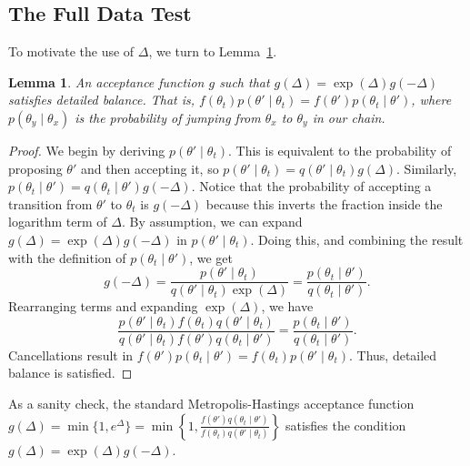 \documentclass{article}
\newtheorem{lemma}{Lemma}
\begin{document}
\subsection{The Full Data Test}\label{ssec:deltas_full}

To motivate the use of $\Delta$, we turn to Lemma~\ref{lem:detailed_balance}.

\begin{lemma}\label{lem:detailed_balance}
An acceptance function $g$ such that $g(\Delta) = \exp(\Delta) g(-\Delta )$ satisfies detailed
balance. That is, $f(\theta_t)p(\theta' \mid \theta_t) = f(\theta')p(\theta_t \mid \theta')$, where
$p(\theta_y \mid \theta_x)$ is the probability of jumping from $\theta_x$ to $\theta_y$ in our
chain.
\end{lemma}

\begin{proof}
We begin by deriving $p(\theta' \mid \theta_t)$. This is equivalent to the probability of proposing
$\theta'$ and then accepting it, so $p(\theta' \mid \theta_t) = q(\theta' \mid \theta_t)g(\Delta).$
Similarly, $p(\theta_t \mid \theta') = q(\theta_t \mid \theta')g(-\Delta).$ Notice that the
probability of accepting a transition from $\theta'$ to $\theta_t$ is $g(-\Delta)$ because this
inverts the fraction inside the logarithm term of $\Delta$.  By assumption, we can expand $g(\Delta)
= \exp(\Delta)g(-\Delta)$ in $p(\theta' \mid \theta_t)$. Doing this, and combining the result with
the definition of $p(\theta_t \mid \theta')$, we get
\begin{equation}\label{eq:combined}
g(-\Delta) = \frac{p(\theta' \mid \theta_t)}{q(\theta' \mid \theta_t)\exp(\Delta)} = \frac{p(\theta_t \mid \theta')}{q(\theta_t \mid \theta')}.
\end{equation}
Rearranging terms and expanding $\exp(\Delta)$, we have
\begin{equation}\label{eq:rearrange}
\frac{p(\theta' \mid \theta_t) f(\theta_t) q(\theta' \mid \theta_t)}{q(\theta' \mid \theta_t) f(\theta') q(\theta_t \mid \theta')} = \frac{p(\theta_t \mid \theta')}{ q(\theta_t \mid \theta')}.
\end{equation}
Cancellations result in $f(\theta') p(\theta_t \mid \theta') = f(\theta_t) p(\theta' \mid
\theta_t)$. Thus, detailed balance is satisfied.
\end{proof}

As a sanity check, the standard Metropolis-Hastings acceptance function $g(\Delta) = \min\{1,
e^\Delta \} = \min\left\{1, \frac{f(\theta')q(\theta_t \mid \theta')}{f(\theta_t)q(\theta' \mid
\theta_t)}\right\}$ satisfies the condition $g(\Delta) = \exp(\Delta)g(-\Delta)$.
\end{document}

